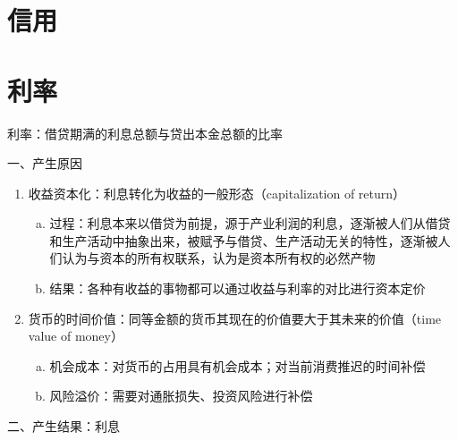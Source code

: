 \documentclass[12pt]{book}
\begin{document}
\chapter{信用}




\chapter{利率}


利率：借贷期满的利息总额与贷出本金总额的比率

一、产生原因

\begin{enumerate}[(1)]
    \item 收益资本化：利息转化为收益的一般形态（capitalization of return）
          \begin{enumerate}[a.]
              \item 过程：利息本来以借贷为前提，源于产业利润的利息，逐渐被人们从借贷和生产活动中抽象出来，被赋予与借贷、生产活动无关的特性，逐渐被人们认为与资本的所有权联系，认为是资本所有权的必然产物
              \item 结果：各种有收益的事物都可以通过收益与利率的对比进行资本定价
          \end{enumerate}
    \item 货币的时间价值：同等金额的货币其现在的价值要大于其未来的价值（time value of money）
          \begin{enumerate}[a.]
              \item 机会成本：对货币的占用具有机会成本；对当前消费推迟的时间补偿
              \item 风险溢价：需要对通胀损失、投资风险进行补偿
          \end{enumerate}
\end{enumerate}


二、产生结果：利息
\end{document}
